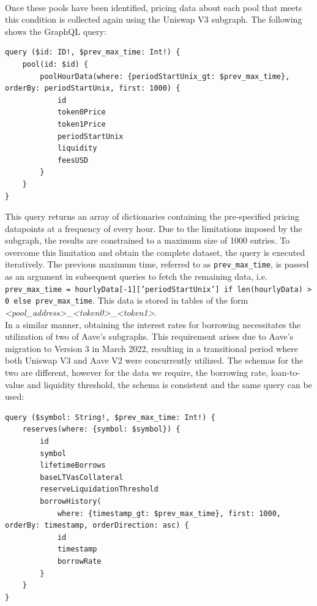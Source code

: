 \\[3mm]
Once these pools have been identified, pricing data about each pool that meets this condition is collected again using the Uniswap V3 subgraph. The following shows the GraphQL query:
\vspace{5mm}
\begin{lstlisting}
query ($id: ID!, $prev_max_time: Int!) {
    pool(id: $id) {
        poolHourData(where: {periodStartUnix_gt: $prev_max_time}, orderBy: periodStartUnix, first: 1000) {
            id
            token0Price
            token1Price
            periodStartUnix
            liquidity
            feesUSD
        }
    }
}
\end{lstlisting}
\vspace{5mm}
This query returns an array of dictionaries containing the pre-specified pricing datapoints at a frequency of every hour. Due to the limitations imposed by the subgraph, the results are constrained to a maximum size of 1000 entries. To overcome this limitation and obtain the complete dataset, the query is executed iteratively. The previous maximum time, referred to as \texttt{prev\_max\_time}, is passed as an argument in subsequent queries to fetch the remaining data, i.e. \texttt{prev\_max\_time = hourlyData[-1]['periodStartUnix'] if len(hourlyData) > 0 else prev\_max\_time}. This data is stored in tables of the form \textit{<pool\_address>}\_\textit{<token0>}\_\textit{<token1>}.
\\[3mm]
In a similar manner, obtaining the interest rates for borrowing necessitates the utilization of two of Aave's subgraphs. This requirement arises due to Aave's migration to Version 3 in March 2022, resulting in a transitional period where both Uniswap V3 and Aave V2 were concurrently utilized. The schemas for the two are different, however for the data we require, the borrowing rate, loan-to-value and liquidity threshold, the schema is consistent and the same query can be used:
\vspace{5mm}
\begin{lstlisting}
query ($symbol: String!, $prev_max_time: Int!) {
    reserves(where: {symbol: $symbol}) {
        id
        symbol
        lifetimeBorrows
        baseLTVasCollateral
        reserveLiquidationThreshold
        borrowHistory(
            where: {timestamp_gt: $prev_max_time}, first: 1000, orderBy: timestamp, orderDirection: asc) {
            id
            timestamp
            borrowRate
        }
    }
}
\end{lstlisting}
\vspace{5mm}
